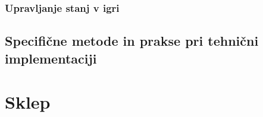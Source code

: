 \documentclass[12pt,a4paper,twoside]{book}
\begin{document}

\subsection{Upravljanje stanj v igri}

\section{Specifične metode in prakse pri tehnični implementaciji}

\chapter{Sklep}\thispagestyle{fancy}

\cleardoublepage


\end{document}
